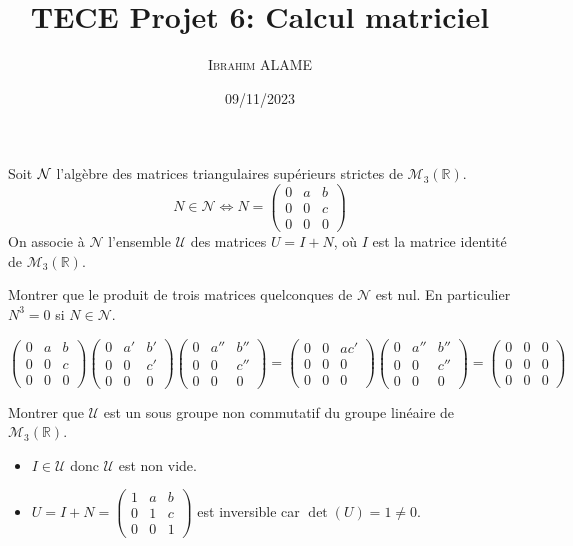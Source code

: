 \documentclass{article}[11pt]
\title{TECE Projet 6: Calcul matriciel}
\author{ \textsc{Ibrahim ALAME}}
\date{09/11/2023}
\begin{document}
\maketitle
\begin{enumerate}
{\color{blue}
\item Soit ${\cal N}$ l'algèbre des matrices triangulaires supérieurs strictes de $\mathcal{M}_3(\mathbb{R})$.
\[N\in \mathcal{N} \Longleftrightarrow N=\left(\begin{array}{ccc} 0&a&b\\ 0&0&c\\0&0&0
\end{array}\right)\]
On associe à $\mathcal{N}$ l'ensemble  $\mathcal{U}$  des matrices $U=I+N$, où $I$ est la matrice identité de $\mathcal{M}_3(\mathbb{R})$.
}
\begin{enumerate}
{\color{blue}
\item  Montrer que le produit de trois matrices quelconques de $\mathcal{N}$ est nul. En particulier $N^3=0$ si $N\in\mathcal{N}$.
}
\[\left(\begin{array}{ccc} 0&a&b\\ 0&0&c\\0&0&0
\end{array}\right)\left(\begin{array}{ccc} 0&a'&b'\\ 0&0&c'\\0&0&0
\end{array}\right) \left(\begin{array}{ccc} 0&a''&b''\\ 0&0&c''\\0&0&0
\end{array}\right)=\left(\begin{array}{ccc} 0&0&ac'\\ 0&0&0\\0&0&0
\end{array}\right) \left(\begin{array}{ccc} 0&a''&b''\\ 0&0&c''\\0&0&0
\end{array}\right)=\left(\begin{array}{ccc} 0&0&0\\ 0&0&0\\0&0&0
\end{array}\right)      \]
{\color{blue}
\item Montrer que $\mathcal{U}$ est un sous groupe non commutatif du groupe linéaire de $\mathcal{M}_3(\mathbb{R})$.
}
\begin{itemize}
\item $I\in\mathcal{U}$ donc $\mathcal{U}$ est non vide.
\item $U=I+N=\left(\begin{array}{ccc} 1&a&b\\ 0&1&c\\0&0&1
\end{array}\right)$ est inversible car $\det(U)=1\neq 0$. 


\end{itemize}
\end{enumerate}
\end{enumerate}
\end{document}
